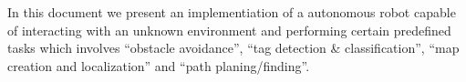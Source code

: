 In this document we present an implementiation of a autonomous robot capable of interacting with an unknown environment and performing certain predefined tasks which involves ``obstacle avoidance'', ``tag detection & classification'', ``map creation and localization'' and ``path planing/finding''.